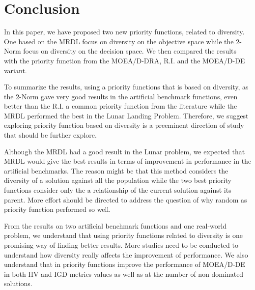 \section{Conclusion}

In this paper, we have proposed two new priority functions, related to diversity. One based on the MRDL focus on diversity on the objective space while the 2-Norm focus on diversity on the decision space. We then compared the results with the priority function from the MOEA/D-DRA, R.I. and the MOEA/D-DE variant. 

To summarize the results, using a priority functions that is based on diversity, as the 2-Norm gave very good results in the artificial benchmark functions, even better than the R.I. a common priority function from the literature while the MRDL performed the best in the Lunar Landing Problem. Therefore, we suggest exploring priority function based on diversity is a preeminent direction of study that should be further explore. 

Although the MRDL had a good result in the Lunar problem, we expected that MRDL would give the best results in terms of improvement in performance in the artificial benchmarks. The reason might be that this method considers the diversity of a solution against all the population while the two best priority functions consider only the a relationship of the current solution against its parent. More effort should be directed to address the question of why random as priority function performed so well.

From the results on two artificial benchmark functions and one real-world problem, we understand that using priority functions related to diversity is one promising way of finding better results. More studies need to be conducted to understand how diversity really affects the improvement of performance. We also understand that in priority functions improve the performance of MOEA/D-DE in both HV and IGD metrics values as well as at the number of non-dominated solutions.%


